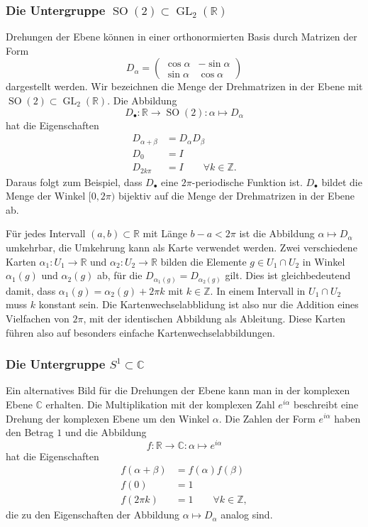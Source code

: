 \subsubsection{Die Untergruppe
$\operatorname{SO}(2)\subset \operatorname{GL}_2(\mathbb{R})$}
Drehungen der Ebene können in einer orthonormierten Basis durch
Matrizen der Form
\[
D_{\alpha}
=
\begin{pmatrix}
\cos\alpha&-\sin\alpha\\
\sin\alpha& \cos\alpha
\end{pmatrix}
\]
dargestellt werden.
Wir bezeichnen die Menge der Drehmatrizen in der Ebene mit
$\operatorname{SO}(2)\subset\operatorname{GL}_2(\mathbb{R})$.
Die Abbildung
\[
D_{\bullet}
\colon
\mathbb{R}\to \operatorname{SO}(2)
:
\alpha \mapsto D_{\alpha}
\]
hat die Eigenschaften
\begin{align*}
D_{\alpha+\beta}&= D_{\alpha}D_{\beta}
\\
D_0&=I
\\
D_{2k\pi}&=I\qquad \forall k\in\mathbb{Z}.
\end{align*}
Daraus folgt zum Beispiel, dass $D_{\bullet}$ eine $2\pi$-periodische
Funktion ist.
$D_{\bullet}$ bildet die Menge der Winkel $[0,2\pi)$ bijektiv auf
die Menge der Drehmatrizen in der Ebene ab.

Für jedes Intervall $(a,b)\subset\mathbb{R}$ mit Länge
$b-a < 2\pi$ ist die Abbildung $\alpha\mapsto D_{\alpha}$ umkehrbar,
die Umkehrung kann als Karte verwendet werden.
Zwei verschiedene Karten $\alpha_1\colon U_1\to\mathbb{R}$ und
$\alpha_2\colon U_2\to\mathbb{R}$ bilden die Elemente $g\in U_1\cap U_2$
in Winkel $\alpha_1(g)$ und $\alpha_2(g)$ ab, für die 
$D_{\alpha_1(g)}=D_{\alpha_2(g)}$ gilt.
Dies ist gleichbedeutend damit, dass $\alpha_1(g)=\alpha_2(g)+2\pi k$
mit $k\in \mathbb{Z}$.
In einem Intervall in $U_1\cap U_2$ muss $k$ konstant sein.
Die Kartenwechselabblidung ist also nur die Addition eines Vielfachen
von $2\pi$, mit der identischen Abbildung als Ableitung.
Diese Karten führen also auf besonders einfache Kartenwechselabbildungen.

\subsubsection{Die Untergruppe $S^1\subset\mathbb{C}$}
Ein alternatives Bild für die Drehungen der Ebene kann man in der komplexen
Ebene $\mathbb{C}$ erhalten.
Die Multiplikation mit der komplexen Zahl $e^{i\alpha}$ beschreibt eine
Drehung der komplexen Ebene um den Winkel $\alpha$.
Die Zahlen der Form $e^{i\alpha}$ haben den Betrag $1$ und die Abbildung
\[
f\colon \mathbb{R}\to \mathbb{C}:\alpha \mapsto e^{i\alpha}
\]
hat die Eigenschaften
\begin{align*}
f(\alpha+\beta) &= f(\alpha)f(\beta)
\\
f(0)&=1
\\
f(2\pi k)&=1\qquad\forall k\in\mathbb{Z},
\end{align*}
die zu den Eigenschaften der Abbildung $\alpha\mapsto D_{\alpha}$ 
analog sind.

